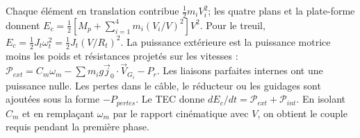 \begin{corrigebox}
Chaque élément en translation contribue $\tfrac12m_iV_i^2$; les
                quatre plans et la plate-forme donnent
                $E_c=\tfrac12[M_p+\sum_{i=1}^4m_i(V_i/V)^2]V^2$.
Pour le treuil, $E_c=\tfrac12J_t\omega_t^2=
                \tfrac12J_t(V/R_t)^2$.
La puissance extérieure est la puissance motrice moins les poids et
                résistances projetés sur les vitesses :
                $\mathcal P_{ext}=C_m\omega_m-\sum m_ig\vec j_0\cdot\vec V_{G_i}-P_r$.
Les liaisons parfaites internes ont une puissance nulle. Les pertes
                dans le câble, le réducteur ou les guidages sont ajoutées sous la forme
                $-P_{pertes}$.
Le TEC donne
                $dE_c/dt=\mathcal P_{ext}+\mathcal P_{int}$. En isolant $C_m$ et en
                remplaçant $\omega_m$ par le rapport cinématique avec $V$, on obtient le
                couple requis pendant la première phase.
\end{corrigebox}
